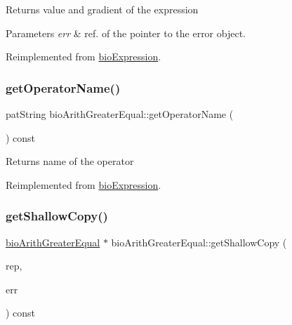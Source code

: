 \begin{DoxyReturn}{Returns}
value and gradient of the expression 
\end{DoxyReturn}

\begin{DoxyParams}{Parameters}
{\em err} & ref. of the pointer to the error object. \\
\hline
\end{DoxyParams}


Reimplemented from \hyperlink{classbio_expression_a91c81ce80c9e972c913b10f5f3c1ed13}{bio\+Expression}.

\mbox{\label{classbio_arith_greater_equal_ab98914bebec6a6dfc6abb9c114a4c7ed}} 
\subsubsection{\texorpdfstring{get\+Operator\+Name()}{getOperatorName()}}
{\footnotesize\ttfamily pat\+String bio\+Arith\+Greater\+Equal\+::get\+Operator\+Name (\begin{DoxyParamCaption}{ }\end{DoxyParamCaption}) const\hspace{0.3cm}{\ttfamily [virtual]}}

\begin{DoxyReturn}{Returns}
name of the operator 
\end{DoxyReturn}


Reimplemented from \hyperlink{classbio_expression_a2353a4afb3a2b0af7c63aba086a72bde}{bio\+Expression}.

\mbox{\label{classbio_arith_greater_equal_a00fdd329a5be536817f97e532ad29fc5}} 
\subsubsection{\texorpdfstring{get\+Shallow\+Copy()}{getShallowCopy()}}
{\footnotesize\ttfamily \hyperlink{classbio_arith_greater_equal}{bio\+Arith\+Greater\+Equal} $\ast$ bio\+Arith\+Greater\+Equal\+::get\+Shallow\+Copy (\begin{DoxyParamCaption}\item[{\hyperlink{classbio_expression_repository}{bio\+Expression\+Repository} $\ast$}]{rep,  }\item[{pat\+Error $\ast$\&}]{err }\end{DoxyParamCaption}) const\hspace{0.3cm}{\ttfamily [virtual]}}

